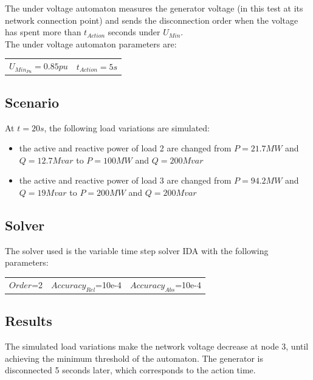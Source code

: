 \documentclass[a4paper, 12pt]{report}
\begin{document}
The under voltage automaton measures the generator voltage (in this test at its network connection point) and sends the disconnection order when the voltage has spent more than $t_{Action}$ seconds under $U_{Min}$.\\

The under voltage automaton parameters are:
\begin{center}
\begin{tabular}{l|l}
   $U_{Min_{Pu}}=0.85pu$ & $t_{Action}=5s$  \\
\end{tabular}
\end{center}

\subsection{Scenario}
At $t=20s$, the following load variations are simulated:
\begin{itemize}
\item{the active and reactive power of load 2 are changed from $P=21.7MW$ and $Q=12.7Mvar$ to $P=100MW$ and $Q=200Mvar$}
\item{the active and reactive power of load 3 are changed from $P=94.2MW$ and $Q=19Mvar$ to $P=200MW$ and $Q=200Mvar$}
\end{itemize}

\subsection{Solver}
The solver used is the variable time step solver IDA with the following parameters:
\begin{center}
\begin{tabular}{l|l|l}
   $Order$=2 & $Accuracy_{Rel}$=10e-4 & $Accuracy_{Abs}$=10e-4 \\
\end{tabular}
\end{center}

\newpage
\subsection{Results}

The simulated load variations make the network voltage decrease at node 3, until achieving the minimum threshold of the automaton. The generator is disconnected 5 seconds later, which corresponds to the action time.\\
\end{document}

